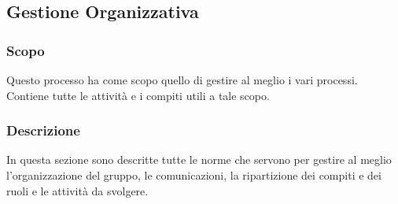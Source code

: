 \subsection{Gestione Organizzativa}
\subsubsection{Scopo}
Questo processo ha come scopo quello di gestire al meglio i vari processi. Contiene tutte le attività e i compiti utili a tale scopo.
\subsubsection{Descrizione}
In questa sezione sono descritte tutte le norme che servono per gestire al meglio l’organizzazione del gruppo, le comunicazioni, la ripartizione dei compiti e dei ruoli e le attività da svolgere.

 

